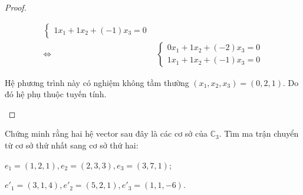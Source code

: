 \documentclass[class=linear-algebra,crop=false]{standalone}
\begin{document}
\begin{proof}
\begin{enumerate}[label = (\alph*)]
\begin{align*}
\begin{cases}
                      1x_{1} + 1x_{2} + (-1)x_{3} = 0
                  \end{cases}                           \\
                  \Leftrightarrow\quad &
                  \begin{cases}
                      0x_{1} + 1x_{2} + (-2)x_{3} = 0 \\
                      1x_{1} + 1x_{2} + (-1)x_{3} = 0
                  \end{cases}
              \end{align*}
              \par Hệ phương trình này có nghiệm không tầm thường $(x_{1}, x_{2}, x_{3}) = (0, 2, 1)$. Do đó hệ phụ thuộc tuyến tính.
    \end{enumerate}
\end{proof}

\begin{exercise}Chứng minh rằng hai hệ vector sau đây là các cơ sở của $\mathbb{C}_{3}$. Tìm ma trận chuyển từ cơ sở thứ nhất sang cơ sở thứ hai:
    \par $e_{1} = (1, 2, 1), e_{2} = (2, 3, 3), e_{3} = (3, 7, 1)$;
    \par $e'_{1} = (3, 1, 4), e'_{2} = (5, 2, 1), e'_{3} = (1, 1, -6)$.
\end{exercise}
\end{document}
